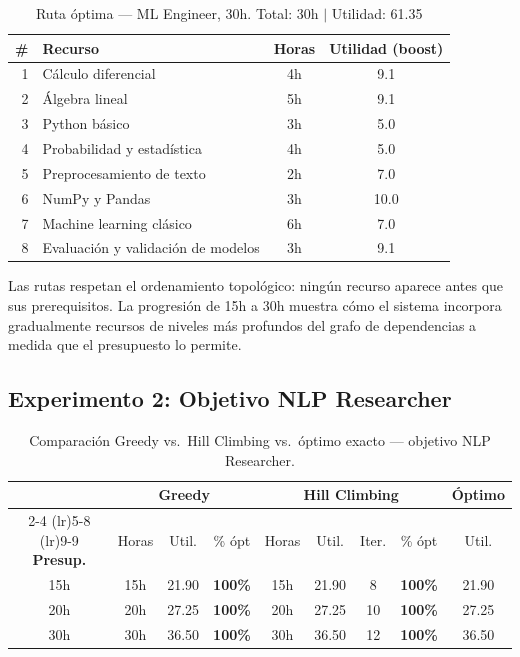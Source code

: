 \documentclass[11pt, a4paper]{article}
\begin{document}
\begin{table}[H]
\centering
\small
\caption{Ruta óptima — ML Engineer, 30h. Total: 30h $|$ Utilidad: 61.35}
\begin{tabular}{r l c c}
\toprule
\textbf{\#} & \textbf{Recurso} & \textbf{Horas} & \textbf{Utilidad (boost)} \\
\midrule
1 & Cálculo diferencial                  & 4h & 9.1  \\
2 & Álgebra lineal                       & 5h & 9.1  \\
3 & Python básico                        & 3h & 5.0  \\
4 & Probabilidad y estadística           & 4h & 5.0  \\
5 & Preprocesamiento de texto            & 2h & 7.0  \\
6 & NumPy y Pandas                       & 3h & 10.0 \\
7 & Machine learning clásico             & 6h & 7.0  \\
8 & Evaluación y validación de modelos   & 3h & 9.1  \\
\bottomrule
\end{tabular}
\end{table}

Las rutas respetan el ordenamiento topológico: ningún recurso aparece antes
que sus prerequisitos. La progresión de 15h a 30h muestra cómo el sistema
incorpora gradualmente recursos de niveles más profundos del grafo de
dependencias a medida que el presupuesto lo permite.
\subsection{Experimento 2: Objetivo NLP Researcher}

\begin{table}[H]
\centering
\small
\caption{Comparación Greedy vs.\ Hill Climbing vs.\ óptimo exacto — objetivo NLP Researcher.}
\begin{tabular}{c ccc cccc c}
\toprule
& \multicolumn{3}{c}{\textbf{Greedy}} & \multicolumn{4}{c}{\textbf{Hill Climbing}} & \textbf{Óptimo} \\
\cmidrule(lr){2-4} \cmidrule(lr){5-8} \cmidrule(lr){9-9}
\textbf{Presup.} & Horas & Util. & \% ópt & Horas & Util. & Iter. & \% ópt & Util. \\
\midrule
15h & 15h & 21.90 & \textbf{\color{alpsgreen}100\%} & 15h & 21.90 & 8 & \textbf{\color{alpsgreen}100\%} & 21.90 \\
20h & 20h & 27.25 & \textbf{\color{alpsgreen}100\%} & 20h & 27.25 & 10 & \textbf{\color{alpsgreen}100\%} & 27.25 \\
30h & 30h & 36.50 & \textbf{\color{alpsgreen}100\%} & 30h & 36.50 & 12 & \textbf{\color{alpsgreen}100\%} & 36.50 \\
\bottomrule
\end{tabular}
\end{table}
\end{document}

